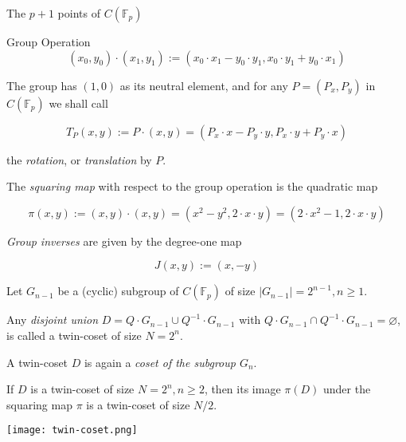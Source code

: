 \documentclass{beamer}
\begin{document}
\begin{frame}
	The $p+1$ points of $C\left(\mathbb{F}_p\right)$ 


\begin{block}{Group Operation} 
$$
\left(x_0, y_0\right) \cdot\left(x_1, y_1\right):=\left(x_0 \cdot x_1-y_0 \cdot y_1, x_0 \cdot y_1+y_0 \cdot x_1\right)
$$
\end{block}
The group has $(1,0)$ as its neutral element, and for any $P=\left(P_x, P_y\right)$ in $C\left(\mathbb{F}_p\right)$ we shall call

$$
T_P(x, y):=P \cdot(x, y)=\left(P_x \cdot x-P_y \cdot y, P_x \cdot y+P_y \cdot x\right)
$$

the \emph{rotation}, or \emph{translation} by $P$. 

The \emph{squaring map} with respect to the group operation is the quadratic map

$$
\pi(x, y):=(x, y) \cdot(x, y)=\left(x^2-y^2, 2 \cdot x \cdot y\right)=\left(2 \cdot x^2-1,2 \cdot x \cdot y\right)
$$

\emph{Group inverses} are given by the degree-one map

$$
J(x, y):=(x,-y)
$$


\end{frame}







\begin{frame}
\begin{definition}
	Let $G_{n-1}$ be a (cyclic) subgroup of $C\left(\mathbb{F}_p\right)$ of size $\left|G_{n-1}\right|=2^{n-1}, n \geq 1$. 
	
	Any \emph{disjoint union} $D=Q \cdot G_{n-1} \cup Q^{-1} \cdot G_{n-1}$ with $Q \cdot G_{n-1} \cap Q^{-1} \cdot G_{n-1}=\varnothing$, is called a twin-coset of size $N=2^n$. 
\end{definition}
\begin{definition}
	A twin-coset $D$ is again a \emph{coset of the subgroup $G_n$}.
\end{definition}
\begin{lemma}
	If $D$ is a twin-coset of size $N=2^n, n \geq 2$, then its image $\pi(D)$ under the squaring map $\pi$ is a twin-coset of size $N / 2$. 
\end{lemma}
\end{frame}

\begin{frame}
	\texttt{[image: twin-coset.png]}
\end{frame}
\end{document}
